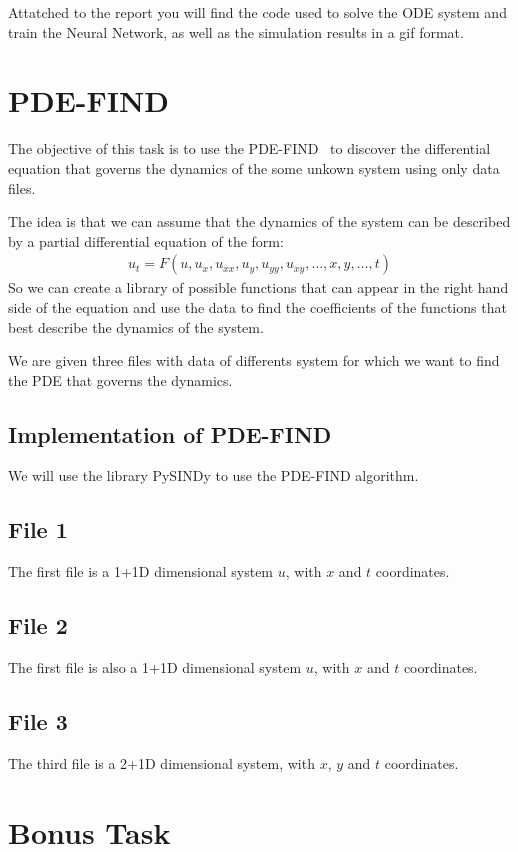 \documentclass[unicode,11pt,a4paper,oneside,numbers=endperiod,openany]{scrartcl}
\begin{document}
Attatched to the report you will find the code used to solve the ODE system and
train the Neural Network, as well as the simulation results in a gif format.

\section{PDE-FIND}\label{sec:task2}
The objective of this task is to use the PDE-FIND~\cite{PDEFIND} to discover the
differential equation that governs the dynamics of the some unkown system using
only data files.

The idea is that we can assume that the dynamics of the system can be described
by a partial differential equation of the form:
\begin{align}
    u_t = F(u, u_x, u_{xx}, u_y, u_{yy}, u_{xy}, \ldots, x, y, \ldots, t)
\end{align}
So we can create a library of possible functions that can appear in the right
hand side of the equation and use the data to find the coefficients of the
functions that best describe the dynamics of the system.

We are given three files with data of differents system for which we want to
find the PDE that governs the dynamics.

\subsection*{Implementation of PDE-FIND}
We will use the library PySINDy to use the PDE-FIND
algorithm. 

\subsection*{File 1}
The first file is a 1+1D dimensional system $u$, with $x$ and $t$ coordinates.

\subsection*{File 2}
The first file is also a 1+1D dimensional system $u$, with $x$ and $t$ coordinates.
\subsection*{File 3}
The third file is a 2+1D dimensional system, with $x$, $y$ and $t$ coordinates.


\section{Bonus Task}\label{sec:task3}




\end{document}
